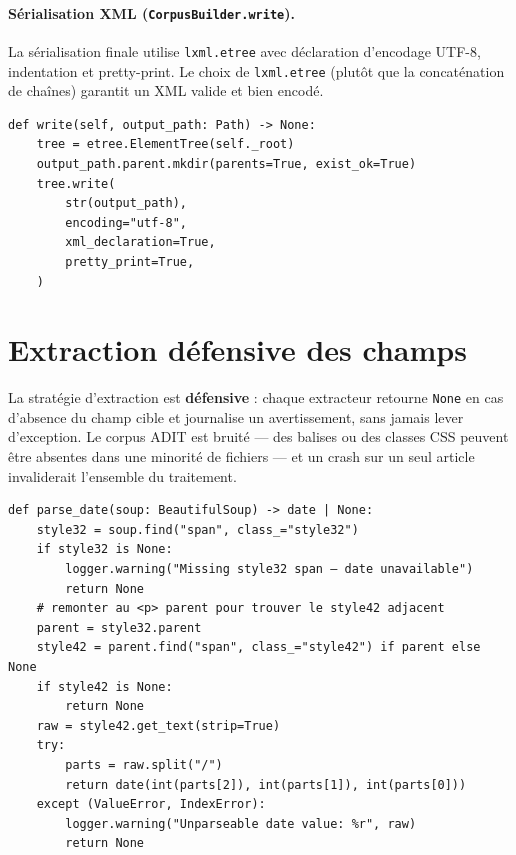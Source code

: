 \paragraph{Sérialisation XML (\texttt{CorpusBuilder.write}).}
La sérialisation finale utilise \texttt{lxml.etree} avec déclaration d'encodage UTF-8,
indentation et pretty-print. Le choix de \texttt{lxml.etree} (plutôt que la concaténation
de chaînes) garantit un XML valide et bien encodé.

\begin{lstlisting}[caption={Sérialisation finale du corpus en XML indenté UTF-8},
  label={lst:corpus_write}]
def write(self, output_path: Path) -> None:
    tree = etree.ElementTree(self._root)
    output_path.parent.mkdir(parents=True, exist_ok=True)
    tree.write(
        str(output_path),
        encoding="utf-8",
        xml_declaration=True,
        pretty_print=True,
    )
\end{lstlisting}

\section{Extraction défensive des champs}

La stratégie d'extraction est \textbf{défensive} : chaque extracteur retourne
\texttt{None} en cas d'absence du champ cible et journalise un avertissement, sans
jamais lever d'exception. Le corpus ADIT est bruité — des balises ou des classes CSS
peuvent être absentes dans une minorité de fichiers — et un crash sur un seul article
invaliderait l'ensemble du traitement.

\begin{lstlisting}[caption={Extraction de la date avec gestion défensive des cas manquants},
  label={lst:parse_date}]
def parse_date(soup: BeautifulSoup) -> date | None:
    style32 = soup.find("span", class_="style32")
    if style32 is None:
        logger.warning("Missing style32 span — date unavailable")
        return None
    # remonter au <p> parent pour trouver le style42 adjacent
    parent = style32.parent
    style42 = parent.find("span", class_="style42") if parent else None
    if style42 is None:
        return None
    raw = style42.get_text(strip=True)
    try:
        parts = raw.split("/")
        return date(int(parts[2]), int(parts[1]), int(parts[0]))
    except (ValueError, IndexError):
        logger.warning("Unparseable date value: %r", raw)
        return None
\end{lstlisting}

